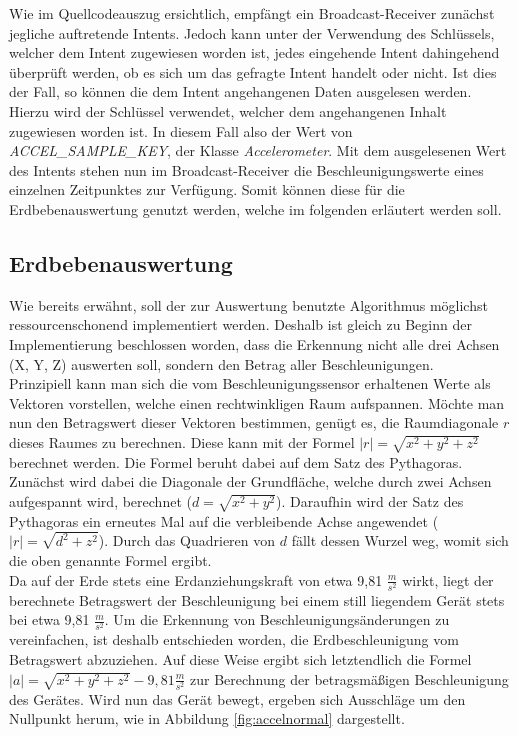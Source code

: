 Wie im Quellcodeauszug ersichtlich, empfängt ein Broadcast-Receiver zunächst jegliche auftretende Intents. Jedoch kann unter der Verwendung des Schlüssels, welcher dem Intent zugewiesen worden ist, jedes eingehende Intent dahingehend überprüft werden, ob es sich um das gefragte Intent handelt oder nicht. Ist dies der Fall, so können die dem Intent angehangenen Daten ausgelesen werden. Hierzu wird der Schlüssel verwendet, welcher dem angehangenen Inhalt zugewiesen worden ist. In diesem Fall also der Wert von \textit{ACCEL\_SAMPLE\_KEY}, der Klasse \textit{Accelerometer}.
Mit dem ausgelesenen Wert des Intents stehen nun im Broadcast-Receiver die Beschleunigungswerte eines einzelnen Zeitpunktes zur Verfügung. Somit können diese für die Erdbebenauswertung genutzt werden, welche im folgenden erläutert werden soll.

\subsection{Erdbebenauswertung}
Wie bereits erwähnt, soll der zur Auswertung benutzte Algorithmus möglichst ressourcenschonend implementiert werden. Deshalb ist gleich zu Beginn der Implementierung beschlossen worden, dass die Erkennung nicht alle drei Achsen (X, Y, Z) auswerten soll, sondern den Betrag aller Beschleunigungen.\\
Prinzipiell kann man sich die vom Beschleunigungssensor erhaltenen Werte als Vektoren
vorstellen, welche einen rechtwinkligen Raum aufspannen. Möchte man nun den Betragswert dieser Vektoren bestimmen, genügt es, die Raumdiagonale $r$ dieses Raumes zu berechnen. Diese kann
mit der Formel $|r| = \sqrt{x^2 + y^2 + z^2}$ berechnet werden. Die Formel beruht dabei auf dem Satz des Pythagoras. Zunächst wird dabei die Diagonale der Grundfläche, welche durch zwei Achsen
aufgespannt wird, berechnet ($d = \sqrt{x^2 + y^2}$). Daraufhin wird der Satz des Pythagoras ein erneutes Mal auf die verbleibende Achse angewendet ( $|r| = \sqrt{d^2 + z^2}$). Durch das Quadrieren von $d$ fällt dessen Wurzel weg, womit sich die oben genannte Formel ergibt.\\
Da auf der Erde stets eine Erdanziehungskraft von etwa 9,81 $\frac{m}{s^2}$ wirkt, liegt der berechnete Betragswert der Beschleunigung bei einem still liegendem Gerät stets bei etwa 9,81 $\frac{m}{s^2}$. Um die Erkennung von Beschleunigungsänderungen zu vereinfachen, ist deshalb entschieden worden, die Erdbeschleunigung vom Betragswert abzuziehen. Auf diese Weise ergibt sich letztendlich die Formel $|a| = \sqrt{x^2 + y^2 + z^2} - 9,81 \frac{m}{s^2}$ zur Berechnung der betragsmäßigen Beschleunigung des Gerätes. Wird nun das Gerät bewegt, ergeben sich Ausschläge um den Nullpunkt herum, wie in Abbildung \ref{fig:accelnormal} dargestellt.

